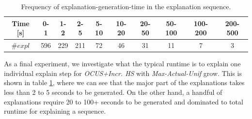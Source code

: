 \begin{table}[!h]
	\centering
	\begin{adjustbox}{max width=\columnwidth}
\begin{tabular}{cccccccccc}
	Time [s] &\textbf{0-1} & \textbf{1-2} & \textbf{2-5} & \textbf{5-10} & \textbf{10-20} & \textbf{20-50} & \textbf{50-100} & \textbf{100-200} & \textbf{200-500}\\
	\midrule
	$\# expl$ &596 & 229 & 211 & 72 & 46 & 31 & 11 & 7 & 3\\
\end{tabular}
\end{adjustbox}
	\caption{Frequency of explanation-generation-time in the explanation sequence.}
	\label{tab:explanation-time}
\end{table}


As a final experiment, we investigate what the typical runtime is to explain one individual explain step for \emph{OCUS+Incr. HS} with \emph{Max-Actual-Unif} grow. 
This is shown in table \ref{tab:explanation-time}, where we can see that the major part of the explanations takes less than 2 to 5 seconds to be generated. On the other hand, a handful of explanations require 20 to 100+ seconds to be generated and dominated to total runtime for explaining a sequence. %

